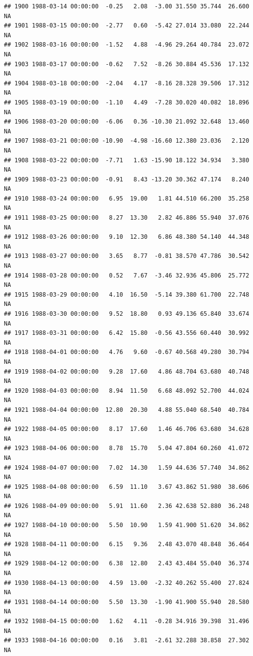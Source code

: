 \documentclass{article}\usepackage{graphicx, color}
\makeatletter
\newenvironment{kframe}{%
 \def\at@end@of@kframe{}%
 \ifinner\ifhmode%
  \def\at@end@of@kframe{\end{minipage}}%
  \begin{minipage}{\columnwidth}%
 \fi\fi%
 \def\FrameCommand##1{\hskip\@totalleftmargin \hskip-\fboxsep
 \colorbox{shadecolor}{##1}\hskip-\fboxsep
     \hskip-\linewidth \hskip-\@totalleftmargin \hskip\columnwidth}%
 \MakeFramed {\advance\hsize-\width
   \@totalleftmargin\z@ \linewidth\hsize
   \@setminipage}}%
 {\par\unskip\endMakeFramed%
 \at@end@of@kframe}
\newenvironment{knitrout}{}{} %
\makeatother
\begin{document}
\begin{knitrout}
\begin{kframe}
\begin{verbatim}
## 1900 1988-03-14 00:00:00  -0.25   2.08  -3.00 31.550 35.744  26.600     NA
## 1901 1988-03-15 00:00:00  -2.77   0.60  -5.42 27.014 33.080  22.244     NA
## 1902 1988-03-16 00:00:00  -1.52   4.88  -4.96 29.264 40.784  23.072     NA
## 1903 1988-03-17 00:00:00  -0.62   7.52  -8.26 30.884 45.536  17.132     NA
## 1904 1988-03-18 00:00:00  -2.04   4.17  -8.16 28.328 39.506  17.312     NA
## 1905 1988-03-19 00:00:00  -1.10   4.49  -7.28 30.020 40.082  18.896     NA
## 1906 1988-03-20 00:00:00  -6.06   0.36 -10.30 21.092 32.648  13.460     NA
## 1907 1988-03-21 00:00:00 -10.90  -4.98 -16.60 12.380 23.036   2.120     NA
## 1908 1988-03-22 00:00:00  -7.71   1.63 -15.90 18.122 34.934   3.380     NA
## 1909 1988-03-23 00:00:00  -0.91   8.43 -13.20 30.362 47.174   8.240     NA
## 1910 1988-03-24 00:00:00   6.95  19.00   1.81 44.510 66.200  35.258     NA
## 1911 1988-03-25 00:00:00   8.27  13.30   2.82 46.886 55.940  37.076     NA
## 1912 1988-03-26 00:00:00   9.10  12.30   6.86 48.380 54.140  44.348     NA
## 1913 1988-03-27 00:00:00   3.65   8.77  -0.81 38.570 47.786  30.542     NA
## 1914 1988-03-28 00:00:00   0.52   7.67  -3.46 32.936 45.806  25.772     NA
## 1915 1988-03-29 00:00:00   4.10  16.50  -5.14 39.380 61.700  22.748     NA
## 1916 1988-03-30 00:00:00   9.52  18.80   0.93 49.136 65.840  33.674     NA
## 1917 1988-03-31 00:00:00   6.42  15.80  -0.56 43.556 60.440  30.992     NA
## 1918 1988-04-01 00:00:00   4.76   9.60  -0.67 40.568 49.280  30.794     NA
## 1919 1988-04-02 00:00:00   9.28  17.60   4.86 48.704 63.680  40.748     NA
## 1920 1988-04-03 00:00:00   8.94  11.50   6.68 48.092 52.700  44.024     NA
## 1921 1988-04-04 00:00:00  12.80  20.30   4.88 55.040 68.540  40.784     NA
## 1922 1988-04-05 00:00:00   8.17  17.60   1.46 46.706 63.680  34.628     NA
## 1923 1988-04-06 00:00:00   8.78  15.70   5.04 47.804 60.260  41.072     NA
## 1924 1988-04-07 00:00:00   7.02  14.30   1.59 44.636 57.740  34.862     NA
## 1925 1988-04-08 00:00:00   6.59  11.10   3.67 43.862 51.980  38.606     NA
## 1926 1988-04-09 00:00:00   5.91  11.60   2.36 42.638 52.880  36.248     NA
## 1927 1988-04-10 00:00:00   5.50  10.90   1.59 41.900 51.620  34.862     NA
## 1928 1988-04-11 00:00:00   6.15   9.36   2.48 43.070 48.848  36.464     NA
## 1929 1988-04-12 00:00:00   6.38  12.80   2.43 43.484 55.040  36.374     NA
## 1930 1988-04-13 00:00:00   4.59  13.00  -2.32 40.262 55.400  27.824     NA
## 1931 1988-04-14 00:00:00   5.50  13.30  -1.90 41.900 55.940  28.580     NA
## 1932 1988-04-15 00:00:00   1.62   4.11  -0.28 34.916 39.398  31.496     NA
## 1933 1988-04-16 00:00:00   0.16   3.81  -2.61 32.288 38.858  27.302     NA

\end{verbatim}
\end{kframe}
\end{knitrout}
\end{document}
